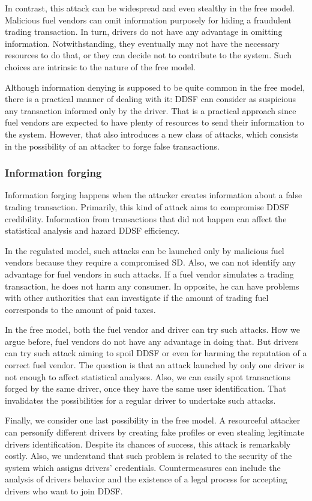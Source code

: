 \documentclass[sigplan]{acmart}
\begin{document}
In contrast, this attack can be widespread and even stealthy in the free model.
Malicious fuel vendors can omit information purposely for hiding a fraudulent trading transaction.
In turn, drivers do not have any advantage in omitting information.
Notwithstanding,  they eventually may not have the necessary resources to do that, or they can decide not to contribute to the system.
Such choices are intrinsic to the nature of the free model.

Although information denying is supposed to be quite common in the free model, there is a practical manner of dealing with it: DDSF can consider as suspicious any transaction informed only by the driver.
That is a practical approach since fuel vendors are expected to have plenty of resources to send their information to the system.
However, that also introduces a new class of attacks, which consists in the possibility of an attacker to forge false transactions.

\subsubsection{Information forging}
Information forging happens when the attacker creates information about a false trading transaction.
Primarily, this kind of attack aims to compromise DDSF credibility.
Information from transactions that did not happen can affect the statistical analysis and hazard DDSF efficiency.

In the regulated model, such attacks can be launched only by malicious fuel vendors because they require a compromised SD.
Also, we can not identify any advantage for fuel vendors in such attacks.
If a fuel vendor simulates a trading transaction, he does not harm any consumer.
In opposite, he can have problems with other authorities that can investigate if the amount of trading fuel corresponds to the amount of paid taxes.

In the free model, both the fuel vendor and driver can try such attacks.
How we argue before, fuel vendors do not have any advantage in doing that.
But drivers can try such attack aiming to spoil DDSF or even for harming the reputation of a correct fuel vendor.
The question is that an attack launched by only one driver is not enough to affect statistical analyses.
Also, we can easily spot transactions forged by the same driver, once they have the same user identification.
That invalidates the possibilities for a regular driver to undertake such attacks.

Finally, we consider one last possibility in the free model.
A resourceful attacker can personify different drivers by creating fake profiles or even stealing legitimate drivers identification.
Despite its chances of success, this attack is remarkably costly.
Also, we understand that such problem is related to the security of the system which assigns drivers' credentials.
Countermeasures can include the analysis of drivers behavior and the existence of a legal process for accepting drivers who want to join DDSF.
\end{document}

